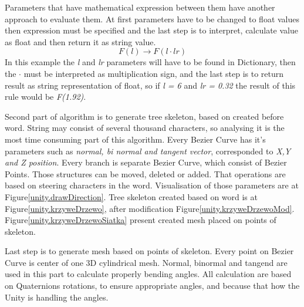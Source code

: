 \documentclass[b5paper,twoside,11pt]{article}
\renewcommand{\figurename}{Figure}
\begin{document}
  Parameters that have mathematical expression between them have another approach to evaluate them. At first parameters have to be changed to float values then expression must be specified and the last step is to interpret, calculate value as float and then return it as string value.
  \begin{equation}
  F(l) \rightarrow F(l \cdot lr)
  \end{equation}
  In this example the \textit{l} and \textit{lr} parameters will have to be found in Dictionary, then the $ \cdot$ must be interpreted as multiplication sign, and the last step is to return result as string representation of float, so if \textit{l = 6} and \textit{lr = 0.32} the result of this rule would be \textit{F(1.92)}.\par
Second part of algorithm is to generate tree skeleton, based on created before word. String may consist of several thousand characters, so analysing it is the most time consuming part of this algorithm.
Every Bezier Curve has it's parameters such as \textit{normal, bi normal and tangent vector}, corresponded to \textit{X,Y and Z position}. Every branch is separate Bezier Curve, which consist of Bezier Points. Those structures can be moved, deleted or added. That operations are based on steering characters in the word.
Visualisation of those parameters are at \figurename\ref{unity.drawDirection}. Tree skeleton created based on word is at \figurename\ref{unity.krzyweDrzewo}, after modification  \figurename\ref{unity.krzyweDrzewoMod}. \figurename\ref{unity.krzyweDrzewoSiatka} present created mesh placed on points of skeleton.
\par
Last step is to generate  mesh based on points of skeleton. Every point on Bezier Curve is center of one 3D cylindrical mesh. Normal, binormal and tangend are used in this part to calculate properly bending angles.
All calculation are based on Quaternions rotations, to ensure appropriate angles, and because that how the Unity is handling the angles.
\end{document}
